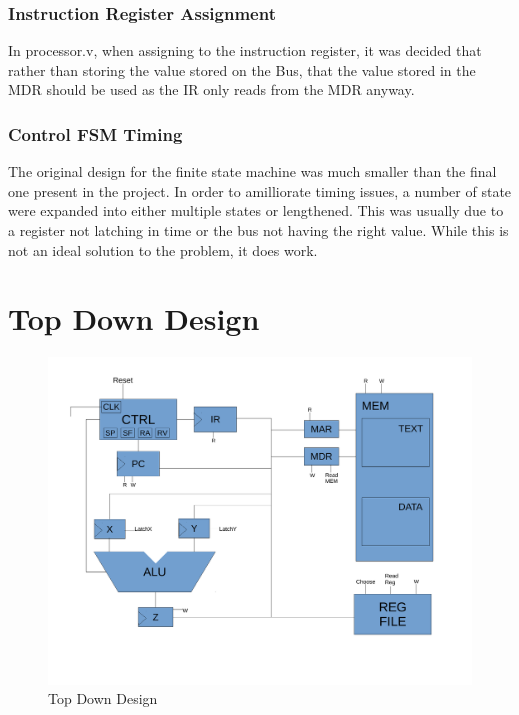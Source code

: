 \documentclass[conference]{IEEEtran}
\begin{document}
\subsubsection{Instruction Register Assignment}
In processor.v, when assigning to the instruction register, it was decided 
that rather than storing the value stored on the Bus, that the value stored
in the MDR should be used as the IR only reads from the MDR anyway.
\subsubsection{Control FSM Timing}
The original design for the finite state machine was much smaller than the 
final one present in the project. In order to amilliorate timing issues, a
number of state were expanded into either multiple states or lengthened. This 
was usually due to a register not latching in time or the bus not having the
right value. While this is not an ideal solution to the problem, it does work.


\clearpage 
\section{Top Down Design}
\begin{figure}[!t]
\centering
\includegraphics[width=\textwidth]{TopDownDesignDraftp1.pdf}
\caption{Top Down Design}
\label{fig_sim}
\end{figure}
\end{document}
